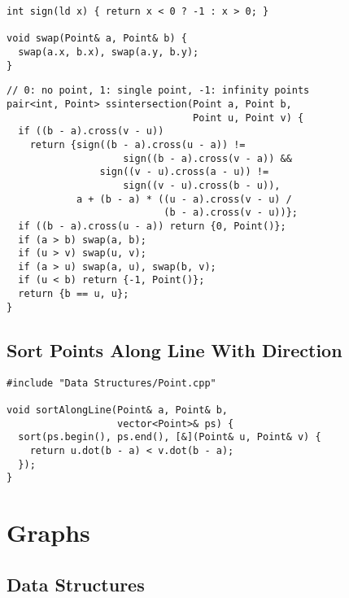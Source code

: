\documentclass[twoside]{article}
\begin{document}
\begin{multicols*}{2}
\begin{verbatim}
int sign(ld x) { return x < 0 ? -1 : x > 0; }

void swap(Point& a, Point& b) {
  swap(a.x, b.x), swap(a.y, b.y);
}
\end{verbatim}
\vspace{-12pt}
\begin{verbatim}
// 0: no point, 1: single point, -1: infinity points
pair<int, Point> ssintersection(Point a, Point b,
                                Point u, Point v) {
  if ((b - a).cross(v - u))
    return {sign((b - a).cross(u - a)) !=
                    sign((b - a).cross(v - a)) &&
                sign((v - u).cross(a - u)) !=
                    sign((v - u).cross(b - u)),
            a + (b - a) * ((u - a).cross(v - u) /
                           (b - a).cross(v - u))};
  if ((b - a).cross(u - a)) return {0, Point()};
  if (a > b) swap(a, b);
  if (u > v) swap(u, v);
  if (a > u) swap(a, u), swap(b, v);
  if (u < b) return {-1, Point()};
  return {b == u, u};
}
\end{verbatim}

\subsectionfont{\large\bfseries\sffamily\underline}
\subsection*{Sort Points Along Line With Direction}
\begin{verbatim}
#include "Data Structures/Point.cpp"

void sortAlongLine(Point& a, Point& b,
                   vector<Point>& ps) {
  sort(ps.begin(), ps.end(), [&](Point& u, Point& v) {
    return u.dot(b - a) < v.dot(b - a);
  });
}
\end{verbatim}

\sectionfont{\bfseries\sffamily\centering\Huge}
\vspace{1em}
\section*{Graphs}
\vspace{3em}
\subsectionfont{\bfseries\sffamily\centering\LARGE}
\vspace{0em}
\subsection*{Data Structures}
\vspace{2em}
\subsubsectionfont{\large\bfseries\sffamily\underline}

\end{multicols*}
\end{document}
